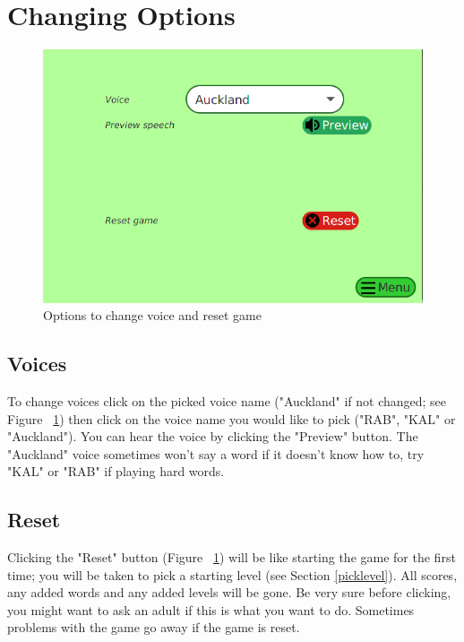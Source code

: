 \documentclass[12pt,a4paper,titlepage,onecolumn]{article}
\begin{document}
	\section{Changing Options}
		\begin{figure}[h]
		\centering
		\includegraphics[width=1\linewidth]{Figures/Options/OptionsGeneral}
		\caption[Options Menu]{Options to change voice and reset game}
		\label{fig:OptionsGeneral}
		\end{figure}
		\subsection{Voices}
		To change voices click on the picked voice name ("Auckland" if not changed; see Figure ~\ref{fig:OptionsGeneral}) then click on the voice name you would like to pick ("RAB", "KAL" or "Auckland"). You can hear the voice by clicking the "Preview" button. The "Auckland" voice sometimes won't say a word if it doesn't know how to, try "KAL" or "RAB" if playing hard words.
		\subsection{Reset}
		Clicking the "Reset" button (Figure ~\ref{fig:OptionsGeneral}) will be like starting the game for the first time; you will be taken to pick a starting level (see Section \ref{picklevel}). All scores, any added words and any added levels will be gone. Be very sure before clicking, you might want to ask an adult if this is what you want to do. Sometimes problems with the game go away if the game is reset.
		
\end{document}
